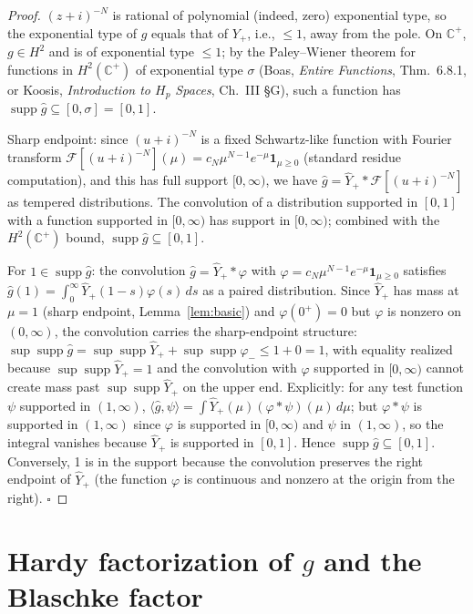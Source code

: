 \documentclass[11pt]{article}
\theoremstyle{definition}
\newcommand{\C}{\mathbb{C}}
\newcommand{\Cp}{\C^{+}}
\newcommand{\supp}{\operatorname{supp}}
\begin{document}
\begin{proof}
$(z+i)^{-N}$ is rational of polynomial (indeed, zero) exponential type, so the exponential type of $g$ equals that of $Y_+$, i.e., $\le 1$, away from the pole. On $\Cp$, $g\in H^2$ and is of exponential type $\le 1$; by the Paley--Wiener theorem for functions in $H^2(\Cp)$ of exponential type $\sigma$ (Boas, \emph{Entire Functions}, Thm.~6.8.1, or Koosis, \emph{Introduction to $H_p$ Spaces}, Ch.~III \S G), such a function has $\supp\hat g\subseteq[0,\sigma]=[0,1]$.

Sharp endpoint: since $(u+i)^{-N}$ is a fixed Schwartz-like function with Fourier transform $\mathcal F[(u+i)^{-N}](\mu)=c_N\mu^{N-1}e^{-\mu}\mathbf 1_{\mu\ge 0}$ (standard residue computation), and this has full support $[0,\infty)$, we have $\hat g=\hat Y_+\ast\mathcal F[(u+i)^{-N}]$ as tempered distributions. The convolution of a distribution supported in $[0,1]$ with a function supported in $[0,\infty)$ has support in $[0,\infty)$; combined with the $H^2(\Cp)$ bound, $\supp\hat g\subseteq[0,1]$.

For $1\in\supp\hat g$: the convolution $\hat g=\hat Y_+\ast\varphi$ with $\varphi=c_N\mu^{N-1}e^{-\mu}\mathbf 1_{\mu\ge 0}$ satisfies $\hat g(1)=\int_0^\infty\hat Y_+(1-s)\varphi(s)\,ds$ as a paired distribution. Since $\hat Y_+$ has mass at $\mu=1$ (sharp endpoint, Lemma~\ref{lem:basic}) and $\varphi(0^+)=0$ but $\varphi$ is nonzero on $(0,\infty)$, the convolution carries the sharp-endpoint structure: $\sup\supp\hat g=\sup\supp\hat Y_++\sup\supp\varphi_-\le 1+0=1$, with equality realized because $\sup\supp\hat Y_+=1$ and the convolution with $\varphi$ supported in $[0,\infty)$ cannot create mass past $\sup\supp\hat Y_+$ on the upper end. Explicitly: for any test function $\psi$ supported in $(1,\infty)$, $\langle\hat g,\psi\rangle=\int\hat Y_+(\mu)(\varphi\ast\psi)(\mu)\,d\mu$; but $\varphi\ast\psi$ is supported in $(1,\infty)$ since $\varphi$ is supported in $[0,\infty)$ and $\psi$ in $(1,\infty)$, so the integral vanishes because $\hat Y_+$ is supported in $[0,1]$. Hence $\supp\hat g\subseteq[0,1]$. Conversely, 1 is in the support because the convolution preserves the right endpoint of $\hat Y_+$ (the function $\varphi$ is continuous and nonzero at the origin from the right). $\square$
\end{proof}

\section{Hardy factorization of $g$ and the Blaschke factor}
\end{document}
